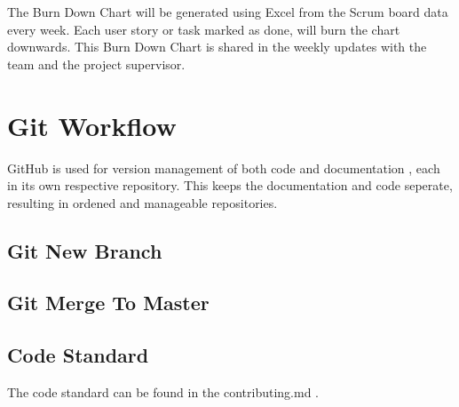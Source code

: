 \documentclass{projdoc}
\begin{document}
The Burn Down Chart will be generated using Excel from the Scrum board data every
week. Each user story or task marked as done, will burn the chart downwards. This
Burn Down Chart is shared in the weekly updates with the team and the project
supervisor.

\section{Git Workflow}

GitHub is used for version management of both code \autocite{crepe:code-repo} and
documentation \autocite{crepe:docs-repo}, each in its own respective repository. This
keeps the documentation and code seperate, resulting in ordened and manageable
repositories.

\subsection{Git New Branch}


\subsection{Git Merge To Master}


\subsection{Code Standard}

The code standard can be found in the contributing.md \autocite{crepe:code-standard}.
\end{document}
